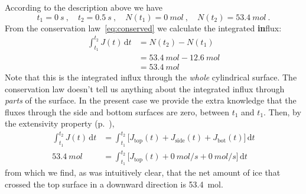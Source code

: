 \documentclass[a4paper,12pt,%
onecolumn,oneside,titlepage,%
british%
]{memoir}
\newcommand*{\di}{\mathrm{d}}%
\renewcommand*{\|}[1][]{\nonscript\:#1\vert\nonscript\:\mathopen{}}
\newcommand*{\yN}{N}
\newcommand*{\yJ}{J}
\begin{document}
According to the description above we have
\begin{equation*}
  t_{1}=\qty{0}{s} \ ,\quad
  t_{2}=\qty{0.5}{s} \ ,\quad
  \yN(t_{1})=\qty{0}{mol} \ ,\quad
  \yN(t_{2})=\qty{53.4}{mol} \ .
\end{equation*}
From the conservation law~\eqref{eq:conserved} we calculate the integrated \textbf{in}flux:
\begin{equation*}
  \begin{split}
    \int_{t_{1}}^{t_{2}}\!\!\yJ(t)\,\di t &= \yN(t_{2}) - \yN(t_{1})
    \\&= \qty{53.4}{mol} - \qty{12.6}{mol}
    \\&= \qty{53.4}{mol}
  \end{split}
\end{equation*}
Note that this is the integrated influx through the \emph{whole} cylindrical surface. The conservation law doesn't tell us anything about the integrated influx through \emph{parts} of the surface. In the present case we provide the extra knowledge that the fluxes through the side and bottom surfaces are zero, between $t_{1}$ and $t_{1}$. Then, by the extensivity property (p.~\pageref{def:extensivity}),
\begin{equation*}
  \begin{split}
    \int_{t_{1}}^{t_{2}}\!\!\yJ(t)\,\di t &=
    \int_{t_{1}}^{t_{2}}\!\bigl[\yJ_{\text{top}}(t) +
    \yJ_{\text{side}}(t) +
    \yJ_{\text{bot}}(t)\bigr]\,\di t
    \\
      \qty{53.4}{mol} &=
      \int_{t_{1}}^{t_{2}}\!\bigl[\yJ_{\text{top}}(t) +
      \qty{0}{mol/s} +
      \qty{0}{mol/s}\bigr]\,\di t
  \end{split}
\end{equation*}
from which we find, as was intuitively clear, that the net amount of ice that crossed the top surface in a downward direction is \qty{53.4}{mol}.

\bigskip
\end{document}
